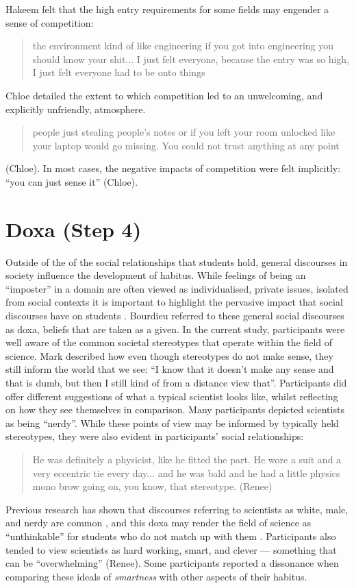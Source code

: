 Hakeem felt that the high entry requirements for some fields may engender a sense of competition: \blockquote{the environment kind of like engineering if you got into engineering you should know your shit... I just felt everyone, because the entry was so high, I just felt everyone had to be onto things} Chloe detailed the extent to which competition led to an unwelcoming, and explicitly unfriendly, atmosphere. \blockquote{people just stealing people’s notes or if you left your room unlocked like your laptop would go missing. You could not trust anything at any point} (Chloe). In most cases, the negative impacts of competition were felt implicitly: ``you can just sense it'' (Chloe). 




\section{Doxa (Step 4)}
Outside of the of the social relationships that students hold, general discourses in society influence the development of habitus. 
While feelings of being an ``imposter'' in a domain are often viewed as individualised, private issues, isolated from social contexts it is important to highlight the pervasive impact that social discourses have on students  \citep{breeze2018imposter}. Bourdieu referred to these general social discourses as doxa, beliefs that are taken as a given. In the current study, participants were well aware of the common societal stereotypes that operate within the field of science. Mark described how even though stereotypes do not make sense, they still inform the world that we see: ``I know that it doesn't make any sense and that is dumb, but then I still kind of from a distance view that''. Participants did offer different suggestions of what a typical scientist looks like, whilst reflecting on how they see themselves in comparison. Many participants depicted scientists as being ``nerdy''. While these points of view may be informed by typically held stereotypes, they were also evident in participants' social relationships: \blockquote{He was definitely a physicist, like he fitted the part. He wore a suit and a very eccentric tie every day... and he was bald and he had a little physics mono brow going on, you know, that stereotype. (Renee)} Previous research has shown that discourses referring to scientists as white, male, and nerdy are common \cite{Nosek_2009}, and this doxa may render the field of science as ``unthinkable'' for students who do not match up with them \cite{Archer_2013}. Participants also tended to view scientists as hard working, smart, and clever --- something that can be ``overwhelming'' (Renee). Some participants reported a dissonance when comparing these ideals of \textit{smartness} with other aspects of their habitus.

